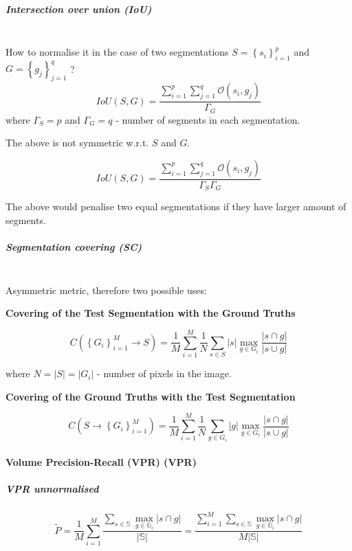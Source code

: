 \subparagraph*{Intersection over union (IoU)}\mbox{}\\
How to normalise it in the case of two segmentations $S=\left\{ {s_{i}}\right\} _{i=1}^{p}$
and $G=\left\{ {g_{j}}\right\} _{j=1}^{q}$ ?
\[
IoU(S,G)=\frac{\sum\limits _{i=1}^{p}\sum\limits _{j=1}^{q}\mathcal{O}\left(s_{i},g_{j}\right)}{\Gamma_{G}}
\]
where $\Gamma_{S}=p$ and $\Gamma_{G}=q$ - number of segments in
each segmentation.

The above is not symmetric w.r.t. $S$ and $G$.

\[
IoU(S,G)=\frac{\sum\limits _{i=1}^{p}\sum\limits _{j=1}^{q}\mathcal{O}\left(s_{i},g_{j}\right)}{\Gamma_{S}\Gamma_{G}}
\]


The above would penalise two equal segmentations if they have larger
amount of segments.


\subparagraph*{Segmentation covering (SC)}\mbox{}\\
Asymmetric metric, therefore two possible uses:

\textbf{Covering of the Test Segmentation with the Ground Truths}

\[
C\left(\left\{ {G_{i}}\right\} _{i=1}^{M}\longrightarrow S\right)=\frac{1}{M}\sum\limits _{i=1}^{M}\frac{1}{N}\sum\limits _{s\in S}\left|s\right|\max_{g\in G_{i}}\frac{\left|s\cap g\right|}{\left|s\cup g\right|}
\]

where $N=\left|S\right|=\left|G_{i}\right|$ - number of pixels in
the image.

\textbf{Covering of the Ground Truths with the Test Segmentation}

\[
C\left(S\longrightarrow\left\{ {G_{i}}\right\} _{i=1}^{M}\right)=\frac{1}{M}\sum\limits _{i=1}^{M}\frac{1}{N}\sum\limits _{g\in G_{i}}\left|g\right|\max_{g\in G_{i}}\frac{\left|s\cap g\right|}{\left|s\cup g\right|}
\]

\paragraph{Volume Precision-Recall (VPR) (VPR)}
\label{VPR-maths}

\subparagraph*{VPR unnormalised}

\[
\tilde{P}=\frac{1}{M}\sum\limits _{i=1}^{M}\frac{\sum\limits _{s\in\mathbb{S}}\max\limits _{g\in\mathbb{G}_{i}}\left|s\cap g\right|}{\left|\mathbb{S}\right|}=\frac{\sum\limits _{i=1}^{M}\sum\limits _{s\in\mathbb{S}}\max\limits _{g\in\mathbb{G}_{i}}\left|s\cap g\right|}{M\left|\mathbb{S}\right|}
\]

